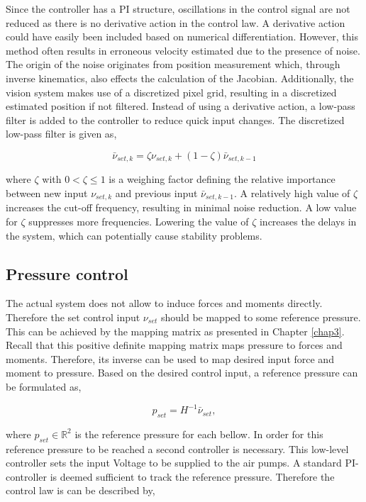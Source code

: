 Since the controller has a PI structure, oscillations in the control signal are not reduced as there is no derivative action in the control law. A derivative action could have easily been included based on numerical differentiation. However, this method often results in erroneous velocity estimated due to the presence of noise. The origin of the noise originates from position measurement which, through inverse kinematics, also effects the calculation of the Jacobian. Additionally, the vision system makes use of a discretized pixel grid, resulting in a discretized estimated position if not filtered. Instead of using a derivative action, a low-pass filter is added to the controller to reduce quick input changes. The discretized low-pass filter is given as,

\begin{equation}
\bar{\nu}_{set,k} = \zeta \nu_{set,k} + (1-\zeta)\bar{\nu}_{set,k-1}
\label{eq4:lowpass}
\end{equation}

where $\zeta$ with $ 0 < \zeta \leq 1$ is a weighing factor defining the relative importance between new input $\nu_{set,k}$ and previous input $\bar{\nu}_{set,k-1}$. A relatively high value of $\zeta$ increases the cut-off frequency, resulting in minimal noise reduction. A low value for $\zeta$ suppresses more frequencies. Lowering the value of $\zeta$ increases the delays in the system, which can potentially cause stability problems. 


\subsection{Pressure control}


The actual system does not allow to induce forces and moments directly. Therefore the set control input $\nu_{set}$ should be mapped to some reference pressure. This can be achieved by the mapping matrix as presented in Chapter \ref{chap3}. Recall that this positive definite mapping matrix maps pressure to forces and moments. Therefore, its inverse can be used to map desired input force and moment to pressure. Based on the desired control input, a reference pressure can be formulated as,

\begin{equation}
    p_{set} = H^{-1}\bar{\nu}_{set},
\end{equation}


where $p_{set} \in \mathbb{R}^2$ is the reference pressure for each bellow. In order for this reference pressure to be reached a second controller is necessary. This low-level controller sets the input Voltage to be supplied to the air pumps. A standard PI-controller is deemed sufficient to track the reference pressure. Therefore the control law is can be described by,

